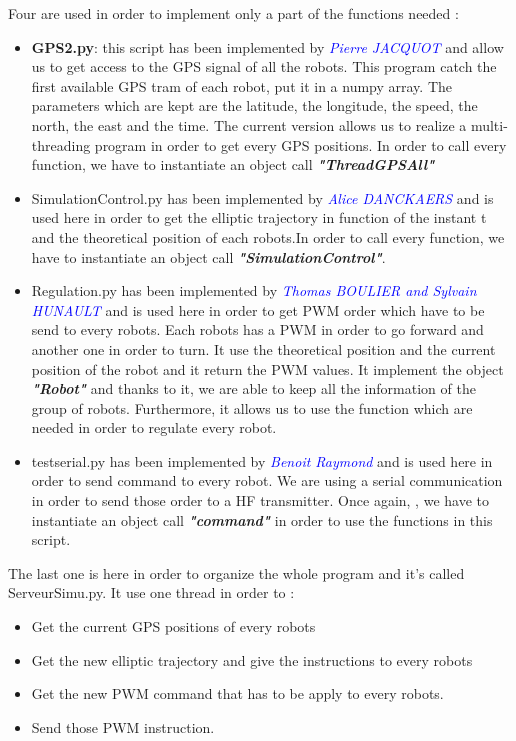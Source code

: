 Four are used in order to implement only a part of the functions needed :
\begin{itemize}

\item \textbf{GPS2.py}: this script has been implemented by \textcolor{blue}{\textit{Pierre JACQUOT}} and allow us to get access to the GPS signal of all the robots. This program catch the first available GPS tram of each robot, put it in a numpy array. The parameters which are kept are the latitude, the longitude, the speed, the north, the east and the time. The current version allows us to realize a multi-threading program in order to get every GPS positions. In order to call every function, we have to instantiate an object call \textbf{\textit{"ThreadGPSAll"}}
\item SimulationControl.py has been implemented by  \textcolor{blue}{\textit{Alice DANCKAERS}} and is used here in order to get the elliptic trajectory in function of the instant t and the theoretical position of each robots.In order to call every function, we have to instantiate an object call \textbf{\textit{"SimulationControl"}}.
\item Regulation.py has been implemented by  \textcolor{blue}{\textit{Thomas BOULIER and Sylvain HUNAULT}} and is used here in order to get PWM order which have to be send to every robots. Each robots has a PWM in order to go forward and another one in order to turn. It use the theoretical position and the current position of the robot and it return the PWM values. It implement the object \textbf{\textit{"Robot"}} and thanks to it, we are able to keep all the information of the group of robots. Furthermore, it allows us to use the function which are needed in order to regulate every robot. 
\item testserial.py has been implemented by  \textcolor{blue}{\textit{Benoit Raymond }} and is used here in order to send command to every robot. We are using a serial communication in order to send those order to a HF transmitter. Once again, , we have to instantiate an object call \textbf{\textit{"command"}} in order to use the functions in this script.

\end{itemize}

\medskip

The last one is here in order to organize the whole program and it's called ServeurSimu.py. It use one thread in order to :
\begin{itemize}
\item Get the current GPS positions of every robots
\item Get the new elliptic trajectory and give the instructions to every robots
\item Get the new PWM command that has to be apply to every robots.
\item Send those PWM instruction. 
\end{itemize}


